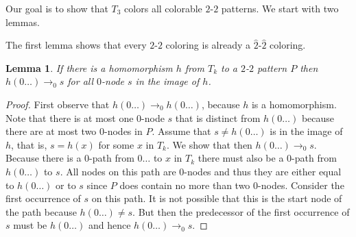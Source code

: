 \documentclass[a4paper]{article}
\newtheorem{lemma}[theorem]{Lemma}
\begin{document}
Our goal is to show that $T_3$ colors all colorable $2$-$2$ patterns. We
start with two lemmas.

The first lemma shows that every $2$-$2$ coloring is already a
$\hat{2}$-$\hat{2}$ coloring.
\begin{lemma} \label{reachability lemma}
 If there is a homomorphism $h$ from $T_k$ to a $2$-$2$ pattern $P$ then
$h(0\dots) \rightarrow_0 s$ for all $0$-node $s$ in the image of $h$.
\end{lemma}
\begin{proof}
 First observe that $h(0\dots) \rightarrow_0 h(0\dots)$, because $h$ is
a homomorphism. Note that there is at most one $0$-node $s$ that is
distinct from $h(0\dots)$ because there are at most two $0$-nodes in
$P$. Assume that $s \neq h(0\dots)$ is in the image of $h$, that is, $s
= h(x)$ for some $x$ in $T_k$. We show that then $h(0\dots)
\rightarrow_0 s$. Because there is a $0$-path from $0\dots$ to $x$ in
$T_k$ there must also be a $0$-path from $h(0\dots)$ to $s$. All nodes
on this path are $0$-nodes and thus they are either equal to $h(0\dots)$
or to $s$ since $P$ does contain no more than two $0$-nodes. Consider
the first occurrence of $s$ on this path. It is not possible that this is
the start node of the path because $h(0\dots) \neq s$. But then the
predecessor of the first occurrence of $s$ must be $h(0\dots)$ and hence
$h(0\dots) \rightarrow_0 s$.
\end{proof}
\end{document}

